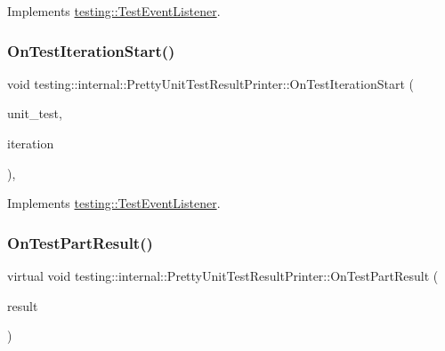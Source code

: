 Implements \mbox{\hyperlink{classtesting_1_1_test_event_listener_a60cc09b7907cb329d152eb5e7133bdeb}{testing\+::\+Test\+Event\+Listener}}.

\mbox{\label{classtesting_1_1internal_1_1_pretty_unit_test_result_printer_a0e7e8909452ef92aaf02f4cffde5ee28}} 
\subsubsection{\texorpdfstring{OnTestIterationStart()}{OnTestIterationStart()}\hspace{0.1cm}{\footnotesize\ttfamily [3/3]}}
{\footnotesize\ttfamily void testing\+::internal\+::\+Pretty\+Unit\+Test\+Result\+Printer\+::\+On\+Test\+Iteration\+Start (\begin{DoxyParamCaption}\item[{const \mbox{\hyperlink{classtesting_1_1_unit_test}{Unit\+Test}} \&}]{unit\+\_\+test,  }\item[{int}]{iteration }\end{DoxyParamCaption})\hspace{0.3cm}{\ttfamily [override]}, {\ttfamily [virtual]}}



Implements \mbox{\hyperlink{classtesting_1_1_test_event_listener_a60cc09b7907cb329d152eb5e7133bdeb}{testing\+::\+Test\+Event\+Listener}}.

\mbox{\label{classtesting_1_1internal_1_1_pretty_unit_test_result_printer_a9c7ca0e58ea0fc96d635ed0cea410ed9}} 
\subsubsection{\texorpdfstring{OnTestPartResult()}{OnTestPartResult()}\hspace{0.1cm}{\footnotesize\ttfamily [1/3]}}
{\footnotesize\ttfamily virtual void testing\+::internal\+::\+Pretty\+Unit\+Test\+Result\+Printer\+::\+On\+Test\+Part\+Result (\begin{DoxyParamCaption}\item[{const Test\+Part\+Result \&}]{result }\end{DoxyParamCaption})\hspace{0.3cm}{\ttfamily [virtual]}}




